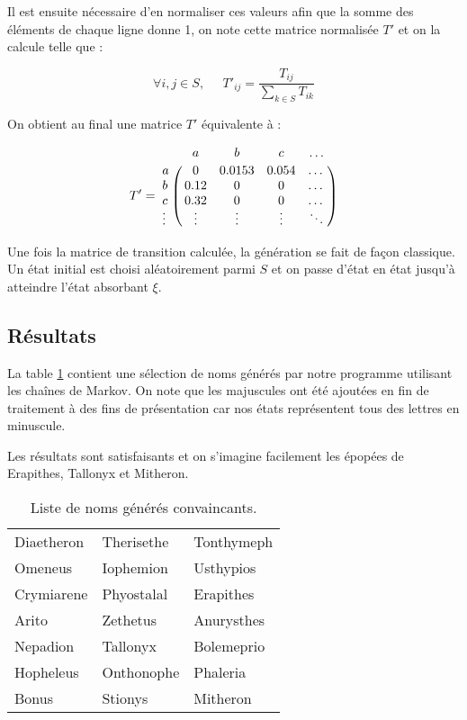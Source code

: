 \documentclass[12pt]{article}
\begin{document}
Il est ensuite nécessaire d'en normaliser ces valeurs afin que la
somme des éléments de chaque ligne donne 1, on note cette matrice
normalisée $T'$ et on la calcule telle que :

$$
\forall i, j \in S,\;\;\;\;\; {T'}_{ij} = \frac{T_{ij}}{\sum_{k \in S} T_{ik}}
$$
\vspace{0.5cm}

On obtient au final une matrice $T'$ équivalente à :

$$
T' = \bordermatrix{
    & a & b & c & \dots \cr
  a & 0 & 0.0153 & 0.054 & \dots \cr
  b & 0.12 & 0 & 0 & \dots \cr
  c & 0.32 & 0 & 0 & \dots \cr
  \vdots & \vdots & \vdots & \vdots & \ddots \cr
}
$$
\vspace{0.5cm}

Une fois la matrice de transition calculée, la génération se fait de
façon classique. Un état initial est choisi aléatoirement parmi $S$ et
on passe d'état en état jusqu'à atteindre l'état absorbant $\xi$.

\subsection{Résultats}

La table \ref{bons} contient une sélection de noms générés par notre
programme utilisant les chaînes de Markov. On note que les majuscules
ont été ajoutées en fin de traitement à des fins de présentation car
nos états représentent tous des lettres en minuscule.

Les résultats sont satisfaisants et on s'imagine facilement les
épopées de Erapithes, Tallonyx et Mitheron.

\begin{table}[H]
  \centering

  \begin{tabular}{l|l|l}
    Diaetheron & Therisethe & Tonthymeph \\
    Omeneus & Iophemion & Usthypios \\
    Crymiarene & Phyostalal & Erapithes \\
    Arito & Zethetus & Anurysthes \\
    Nepadion & Tallonyx & Bolemeprio \\
    Hopheleus & Onthonophe & Phaleria \\
    Bonus & Stionys & Mitheron
  \end{tabular}

  \caption{Liste de noms générés convaincants.}
  \label{bons}

\end{table}
\end{document}
